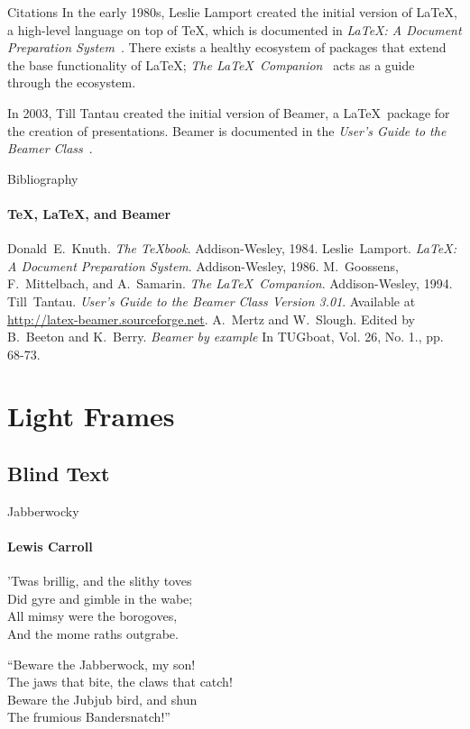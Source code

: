 \documentclass{beamer}
\begin{document}
\begin{darkframes}
\begin{frame}[label=citations]{Citations}
In the early 1980s, Leslie Lamport created the initial version
of \LaTeX, a high-level language on top of \TeX, which is
documented in \emph{\LaTeX : A Document Preparation
System}~\cite{lamport94}. There exists a healthy ecosystem of
packages that extend the base functionality of \LaTeX;
\emph{The \LaTeX\ Companion}~\cite{MG94} acts as a guide
through the ecosystem.

In 2003, Till Tantau created the initial version of Beamer, a
\LaTeX\ package for the creation of presentations. Beamer is
documented in the \emph{User's Guide to the Beamer
Class}~\cite{tantau04}.
\end{frame}

\begin{frame}[label=bibliography]{Bibliography}
\framesubtitle{\TeX, \LaTeX, and Beamer}
\begin{thebibliography}{9}
Donald~E.~Knuth.
\emph{The \TeX book}.
Addison-Wesley, 1984.
Leslie~Lamport.
\emph{\LaTeX : A Document Preparation System}.
Addison-Wesley, 1986.
M.~Goossens, F.~Mittelbach, and A.~Samarin.
\emph{The \LaTeX\ Companion}.
Addison-Wesley, 1994.
Till~Tantau.
\emph{User's Guide to the Beamer Class Version 3.01}.
Available at \url{http://latex-beamer.sourceforge.net}.
A.~Mertz and W.~Slough.
Edited by B.~Beeton and K.~Berry.
\emph{Beamer by example} In TUGboat,
Vol. 26, No. 1., pp. 68-73.
\end{thebibliography}
\end{frame}

\end{darkframes}

\section{Light Frames}
\subsection{Blind Text}
\begin{frame}{Jabberwocky}
\framesubtitle{Lewis Carroll}%
%
'Twas brillig, and the slithy toves\\
Did gyre and gimble in the wabe;\\
All mimsy were the borogoves,\\
And the mome raths outgrabe.\\\bigskip

“Beware the Jabberwock, my son!\\
The jaws that bite, the claws that catch!\\
Beware the Jubjub bird, and shun\\
The frumious Bandersnatch!”\\
\end{frame}
\end{document}
